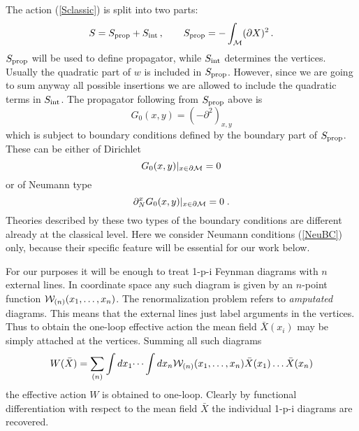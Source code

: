 \documentclass[a4paper,12pt]{article}
\begin{document}
The action (\ref{Sclassic}) is split into two parts:
\begin{equation}
S=S_{{\mbox {\scriptsize {prop}}}}+S_{{\mbox {\scriptsize {int}}}}
\,,\qquad S_{{\mbox {\scriptsize {prop}}}}=
-\int_{\cal M} (\partial X)^2 \,.
\label{Ssplit}
\end{equation}
$S_{{\mbox {\scriptsize {prop}}}}$ will be used to define propagator,
while $S_{{\mbox {\scriptsize {int}}}}$ determines the vertices.
Usually the quadratic part of $w$ is included in 
$S_{{\mbox {\scriptsize {prop}}}}$. However, since we are going
to sum anyway all possible insertions we are allowed to include
the quadratic terms in $S_{{\mbox {\scriptsize {int}}}}$.
The propagator following from $S_{{\mbox {\scriptsize {prop}}}}$
above is 
\begin{equation}
G_0(x,y)=(-\partial^2)_{x,y} \label{G0}
\end{equation}
which is subject to boundary conditions defined by the
boundary part of $S_{{\mbox {\scriptsize {prop}}}}$.
These can be either of  Dirichlet 
\begin{equation}
G_0(x,y)|_{x\in {\partial {\cal M}}}=0 \label{DirBC}
\end{equation}
or of Neumann type 
\begin{equation}
\partial_N^xG_0(x,y)|_{x\in {\partial {\cal M}}}=0\; . \label{NeuBC}
\end{equation}
Theories described by these two types
of the boundary conditions are different already at the
classical level. Here we consider Neumann conditions (\ref{NeuBC})
only, because their specific feature will be essential for 
our work below. 

For our purposes it will be enough to treat 
1-p-i Feynman diagrams 
with $n$ external lines. In coordinate space any such diagram
is given by an $n$-point function ${\cal W}_{(n)}(x_1,\dots ,x_n)$.
The renormalization problem refers to
{\it amputated} diagrams. This means that the external
lines just label arguments in the  vertices. Thus to obtain the 
one-loop effective action the mean field
$\bar X(x_i)$ may be simply attached at the vertices. 
Summing all such diagrams 
\begin{equation}
W(\bar X)=\sum_{(n)} \int dx_1 \dots \int dx_n 
{\cal W}_{(n)}(x_1,\dots ,x_n) \bar X(x_1) \dots \bar X(x_n)
\label{effact}
\end{equation}
the effective action $W$ is obtained to one-loop. Clearly 
by functional differentiation with respect to the mean field $\bar X$
the individual 1-p-i diagrams are recovered. 
\end{document}
